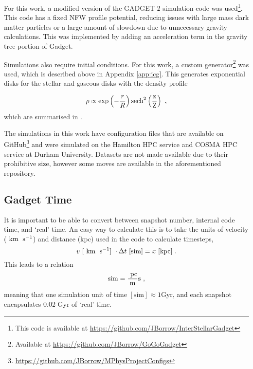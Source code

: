 For this work, a modified version of the GADGET-2 simulation code \citep{springel_cosmological_2005} was
used\footnote{This code is available at
  \url{https://github.com/JBorrow/InterStellarGadget}}. This code has a fixed
NFW profile potential, reducing issues with large mass dark matter
particles or a large amount of slowdown due to unnecessary gravity
calculations. This was implemented by adding an acceleration term in the
gravity tree portion of Gadget.

Simulations also require initial conditions. For this work, a custom
generator\footnote{Available at \url{https://github.com/JBorrow/GoGoGadget}}
was used, which is described above in Appendix \ref{app:icg}. This generates exponential disks for the stellar and gaseous
disks with the density profile

\begin{equation}
\rho \propto \exp\left(-\frac{r}{R}\right)\rm{sech}^2\left(\frac{z}{Z}\right)~,
\end{equation}
which are summarised in \citet{ferriere_interstellar_2001}.

The simulations in this work have configuration files that are
available on GitHub\footnote{\url{https://github.com/JBorrow/MPhysProjectConfigs}} and were simulated on the
Hamilton HPC service and COSMA HPC service at Durham University. Datasets are not made
available due to their prohibitive size, however some moves are
available in the aforementioned repository.

\subsection{Gadget Time}
\label{app:gadgettime}

It is important to be able to convert between snapshot number, internal code time, and `real' time.
An easy way to calculate this is to take the units of velocity ($~\mathrm{km}\;~\mathrm{s}^{-1}$) and distance (kpc) used in the code to calculate timesteps,
$$
    v ~ [~\mathrm{km}\;~\mathrm{s}^{-1}] ~ \cdot \Delta t ~ [\mathrm{sim}] = x ~ [\mathrm{kpc}]~.
$$
This leads to a relation
$$
    \mathrm{sim} = \frac{~\mathrm{pc}}{\mathrm{m}} \mathrm{s}~,
$$
meaning that one simulation unit of time $[\mathrm{sim}] \approx 1 \mathrm{Gyr}$, and each snapshot encapsulates 0.02 Gyr of `real' time.
